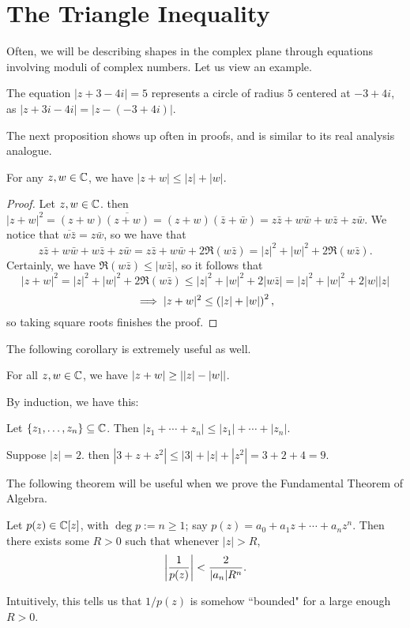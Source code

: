 \documentclass{article}
\begin{document}
\section{The Triangle Inequality}
Often, we will be describing shapes in the complex plane through equations involving moduli of complex numbers. Let us view an example.
\begin{example}
The equation $|z+3-4i|=5$ represents a circle of radius $5$ centered at $-3+4i$, as $|z+3i-4i| = |z-(-3+4i)|.$
\end{example}
The next proposition shows up often in proofs, and is similar to its real analysis analogue.
\begin{proposition}
For any $z,w\in\mathbb C$, we have $|z+w|\leq |z|+|w|$.
\end{proposition}
\begin{proof}
Let $z,w\in\mathbb C$. then $|z+w|^2 = (z+w)\overline{(z+w)} = (z+w)(\bar z+\bar w) = z\bar z + w\bar w + w\bar z + z\bar w$. We notice that $\overline{w\bar z} = z\bar w$, so we have that 
$$z\bar z+w\bar w + w\bar z + z\bar w = z\bar z + w\bar w + 2\Re(w\bar z) = |z|^2+|w|^2 + 2\Re(w\bar z).$$
Certainly, we have $\Re(w\bar z) \leq |w\bar z|$, so it follows that
$$|z+w|^2 = |z|^2+|w|^2+2\Re(w\bar z) \leq |z|^2 + |w|^2 + 2|w\bar z|  = |z|^2+|w|^2 + 2|w||z|$$
$$\implies |z+w|^2 \leq \left(|z|+|w| \right)^2,$$
so taking square roots finishes the proof.
\end{proof}
The following corollary is extremely useful as well.
\begin{corollary}
For all $z,w\in\mathbb C$, we have $|z+w| \geq \left||z| - |w|\right|$.
\end{corollary}
By induction, we have this:
\begin{corollary}
Let $\{z_1,\ldots, z_n\}\subseteq \mathbb C$. Then $|z_1 + \cdots + z_n|\leq |z_1| + \cdots + |z_n|$.
\end{corollary}
\begin{example}
Suppose $|z|=2$. then $|3+z+z^2| \leq |3| + |z| + |z^2| = 3+2+4= 9$.
\end{example}
The following theorem will be useful when we prove the Fundamental Theorem of Algebra.
\begin{theorem}
Let $p(z)\in\mathbb C[z]$, with $\deg p := n \geq 1$; say $p(z) = a_0 + a_1z + \cdots + a_nz^n$. Then there exists some $R > 0$ such that whenever $|z|>R$,
$$\left|\frac 1{p(z)}\right| < \frac 2{|a_n|R^n}.$$
\end{theorem}
Intuitively, this tells us that $1/p(z)$ is somehow ``bounded" for a large enough $R>0$.
\end{document}
